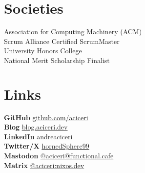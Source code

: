 \documentclass[]{cv}
\begin{document}
\begin{minipage}[t]{0.33\textwidth}

\section{Societies}
Association for Computing Machinery (ACM)\\
Scrum Alliance Certified ScrumMaster\\
University Honors College\\
National Merit Scholarship Finalist \\
\sectionsep


\section{Links}
{\bf GitHub} \href{https://github.com/}{github.com/aciceri} \\
{\bf Blog} \href{https://blog.aciceri.dev}{blog.aciceri.dev} \\
{\bf LinkedIn} \href{https://www.linkedin.com/}{andreaciceri} \\
{\bf Twitter/X} \href{https://x.com/hornedSphere99}{hornedSphere99} \\
{\bf Mastodon} \href{https://functional.cafe/@aciceri}{@aciceri@functional.cafe} \\
{\bf Matrix} \href{https://matrix.to/#/@aciceri:nixos.dev}{@aciceri:nixos.dev}
\sectionsep

\end{minipage}
\end{document}
